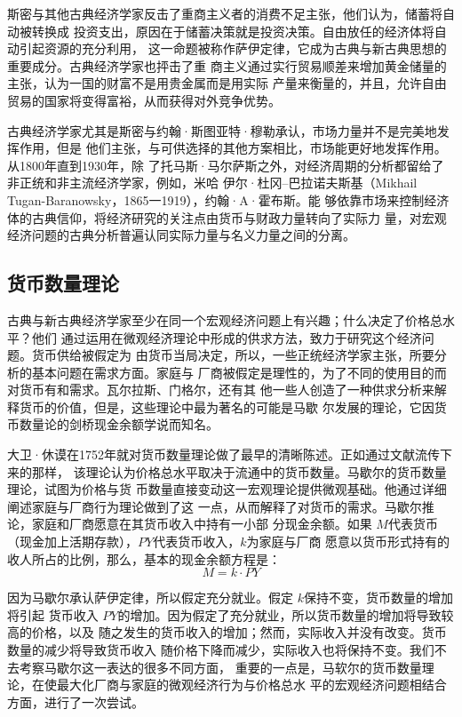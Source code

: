 斯密与其他古典经济学家反击了重商主义者的消费不足主张，他们认为，储蓄将自动被转换成
投资支出，原因在于储蓄决策就是投资决策。自由放任的经济体将自动引起资源的充分利用，
这一命题被称作萨伊定律，它成为古典与新古典思想的重要成分。古典经济学家也抨击了重
商主义通过实行贸易顺差来增加黄金储量的主张，认为一国的财富不是用贵金属而是用实际
产量来衡量的，并且，允许自由贸易的国家将变得富裕，从而获得对外竞争优势。

古典经济学家尤其是斯密与约翰·斯图亚特·穆勒承认，市场力量并不是完美地发挥作用，但是
他们主张，与可供选择的其他方案相比，市场能更好地发挥作用。从1800年直到1930年，除
了托马斯·马尔萨斯之外，对经济周期的分析都留给了非正统和非主流经济学家，例如，米哈
伊尔·杜冈--巴拉诺夫斯基（Mikhail Tugan-Baranowsky，1865一1919），约翰·A·霍布斯。能
够依靠市场来控制经济体的古典信仰，将经济研究的关注点由货币与财政力量转向了实际力
量，对宏观经济问题的古典分析普遍认同实际力量与名义力量之间的分离。


\subsection{货币数量理论}

古典与新古典经济学家至少在同一个宏观经济问题上有兴趣；什么决定了价格总水平？他们
通过运用在微观经济理论中形成的供求方法，致力于研究这个经济问题。货币供给被假定为
由货币当局决定，所以，一些正统经济学家主张，所要分析的基本问题在需求方面。家庭与
厂商被假定是理性的，为了不同的使用目的而对货币有和需求。瓦尔拉斯、门格尔，还有其
他一些人创造了一种供求分析来解释货币的价值，但是，这些理论中最为著名的可能是马歇
尔发展的理论，它因货币数量论的剑桥现金余额学说而知名。

大卫·休谟在1752年就对货币数量理论做了最早的清晰陈述。正如通过文献流传下来的那样，
该理论认为价格总水平取决于流通中的货币数量。马歇尔的货币数量理论，试图为价格与货
币数量直接变动这一宏观理论提供微观基础。他通过详细阐述家庭与厂商行为理论做到了这
一点，从而解释了对货币的需求。马歇尔推论，家庭和厂商愿意在其货币收入中持有一小部
分现金余额。如果 $M$代表货币（现金加上活期存款），$PY$代表货币收入，$k$为家庭与厂商
愿意以货币形式持有的收人所占的比例，那么，基本的现金余额方程是：
\[ M = k \cdot PY\]

因为马歇尔承认萨伊定律，所以假定充分就业。假定 $k$保持不变，货币数量的增加将引起
货币收入 $PY$的增加。因为假定了充分就业，所以货币数量的增加将导致较高的价格，以及
随之发生的货币收入的增加；然而，实际收入并没有改变。货币数量的减少将导致货币收入
随价格下降而减少，实际收入也将保持不变。我们不去考察马歇尔这一表达的很多不同方面，
重要的一点是，马软尔的货币数量理论，在使最大化厂商与家庭的微观经济行为与价格总水
平的宏观经济问题相结合方面，进行了一次尝试。

